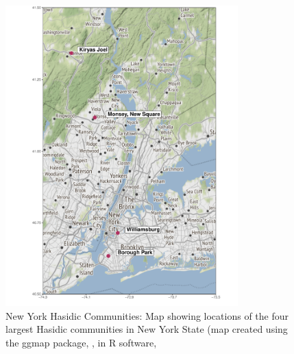 \documentclass[output=paper]{langsci/langscibook}
\begin{document}
\begin{figure}
\centering
\includegraphics[width=0.8\textwidth]{figures/nove-fig1-color.pdf}
\caption{New York Hasidic Communities: Map showing  locations of the four largest Hasidic communities in New York State (map created using the ggmap package, \citealt{KahleWickham2013}, in R software, \citealt{RCore2017}}\label{fig:nove:1}
\end{figure}
\end{document}
